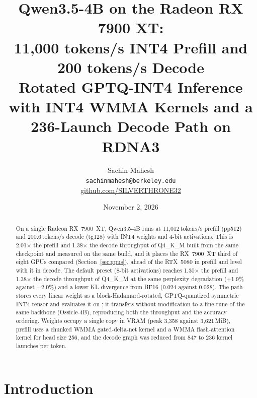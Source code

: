 \documentclass[10.5pt,a4paper]{article}
\title{\textbf{Qwen3.5-4B on the Radeon RX 7900 XT:\\ 11{,}000 tokens/s INT4 Prefill and 200 tokens/s Decode}\\[4pt]
\large Rotated GPTQ-INT4 Inference with INT4 WMMA Kernels and a 236-Launch Decode Path on RDNA3}
\author{Sachin Mahesh\\ \texttt{sachinmahesh@berkeley.edu}\\ \href{https://github.com/SILVERTHRONE32}{github.com/SILVERTHRONE32}}
\date{November 2, 2026}
\newcommand{\tx}[1]{\texttt{\detokenize{#1}}}
\begin{document}
\maketitle
\vspace{-0.9cm}

\begin{abstract}
\noindent
On a single Radeon RX~7900~XT, Qwen3.5-4B runs at 11{,}012\,tokens/s prefill (pp512) and 200.6\,tokens/s decode (tg128) with INT4 weights and 4-bit activations. This is 2.01$\times$ the prefill and
1.38$\times$ the decode throughput of Q4\_K\_M built from the same checkpoint and measured on the same build, and it places the RX~7900~XT third of eight GPUs compared (Section~\ref{sec:gpus}), ahead of the
RTX~5080 in prefill and level with it in decode. The default preset (8-bit activations) reaches 1.30$\times$ the prefill and 1.38$\times$ the decode throughput of Q4\_K\_M at the same perplexity degradation
(+1.9\% against +2.0\%) and a lower KL divergence from BF16 (0.024 against 0.028). The path stores every linear weight as a block-Hadamard-rotated, GPTQ-quantized symmetric INT4 tensor and evaluates it on
\tx{v_wmma_i32_16x16x16_iu4}; it transfers without modification to a fine-tune of the same backbone (Ossicle-4B), reproducing both the throughput and the accuracy ordering. Weights occupy a single copy in VRAM
(peak 3{,}358 against 3{,}621\,MiB), prefill uses a chunked WMMA gated-delta-net kernel and a WMMA flash-attention kernel for head size 256, and the decode graph was reduced from 847 to 236 kernel launches per token.
\end{abstract}

\section{Introduction}
\end{document}
